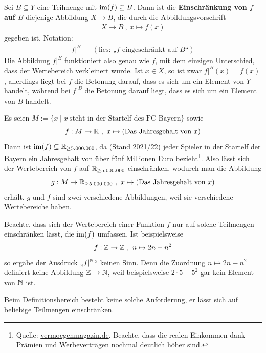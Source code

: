 \begin{defin}\label{def:zielschrank}
    Sei $B\subseteq Y$ eine Teilmenge mit $\operatorname{im}(f) \subseteq B$. Dann ist die \textbf{Einschränkung von $f$ auf $B$} diejenige Abbildung $X \to B$, die durch die Abbildungsvorschrift
    \begin{align*}
        X \to B \ ,\ x \mapsto f(x)
    \end{align*}
    gegeben ist. Notation:
    \begin{align*}
        f\vert^B && (\text{lies: „$f$ eingeschränkt auf $B$“})
    \end{align*}
    Die Abbildung $f\vert^B$ funktioniert also genau wie $f$, mit dem einzigen Unterschied, dass der Wertebereich verkleinert wurde. Ist $x\in X$, so ist zwar $f\vert^B(x) = f(x)$, allerdings liegt bei $f$ die Betonung darauf, dass es sich um ein Element von $Y$ handelt, während bei $f\vert^{B}$ die Betonung darauf liegt, dass es sich um ein Element von $B$ handelt.
\end{defin}


\begin{bsp}
    Es seien $M := \{ x\mid x\ \text{steht in der Startelf des FC Bayern} \}$ sowie
        \[ f : M \to \mathbb R \ ,\ x \mapsto (\text{Das Jahresgehalt von $x$}) \]
    Dann ist $\operatorname{im}(f)\subseteq \mathbb R_{\ge 5.000.000}$, da (Stand 2021/22) jeder Spieler in der Startelf der Bayern ein Jahresgehalt von über fünf Millionen Euro bezieht\footnote{Quelle: \href{https://www.vermoegenmagazin.de/bayern-muenchen-gehaelter/}{vermoegenmagazin.de}. Beachte, dass die realen Einkommen dank Prämien und Werbeverträgen nochmal deutlich höher sind.}. Also lässt sich der Wertebereich von $f$ auf $\mathbb R_{\ge 5.000.000}$ einschränken, wodurch man die Abbildung
        \[ g: M \to \mathbb R_{\ge 5.000.000} \ ,\ x \mapsto (\text{Das Jahresgehalt von $x$}) \]
    erhält. $g$ und $f$ sind zwei verschiedene Abbildungen, weil sie verschiedene Wertebereiche haben.
\end{bsp}


\begin{bem} \label{einschraenkbarkeit}
    Beachte, dass sich der Wertebereich einer Funktion $f$ nur auf solche Teilmengen einschränken lässt, die $\operatorname{im}(f)$ umfassen. Ist beispielsweise
        \[ f : \mathbb Z \to \mathbb Z \ ,\ n \mapsto 2n-n^2 \]
    so ergäbe der Ausdruck „$f\vert^{\mathbb N}$“ keinen Sinn. Denn die Zuordnung $n\mapsto 2n-n^2$ definiert keine Abbildung $\mathbb Z\to \mathbb N$, weil beispielsweise $2\cdot 5 - 5^2$ gar kein Element von $\mathbb N$ ist.

    Beim Definitionsbereich besteht keine solche Anforderung, er lässt sich auf beliebige Teilmengen einschränken.
\end{bem}





